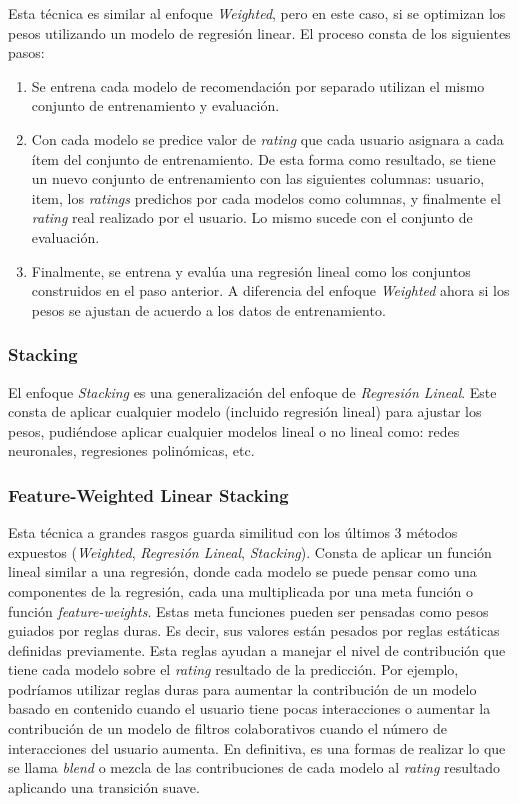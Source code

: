 \documentclass[11pt,a4paper,twoside]{thesis}
\begin{document}
Esta técnica es similar al enfoque \textit{Weighted}, pero en este caso, si se
optimizan los pesos utilizando un modelo de regresión linear. El proceso consta
de los siguientes pasos:

\begin{enumerate}
	\item Se entrena cada modelo de recomendación por separado utilizan el mismo conjunto
	      de entrenamiento y evaluación.
	\item Con cada modelo se predice valor de \textit{rating} que cada usuario asignara a
	      cada ítem del conjunto de entrenamiento. De esta forma como resultado, se tiene
	      un nuevo conjunto de entrenamiento con las siguientes columnas: usuario, item,
	      los \textit{ratings} predichos por cada modelos como columnas, y finalmente el
	      \textit{rating} real realizado por el usuario. Lo mismo sucede con el conjunto
	      de evaluación.
	\item Finalmente, se entrena y evalúa una regresión lineal como los conjuntos
	      construidos en el paso anterior. A diferencia del enfoque \textit{Weighted}
	      ahora si los pesos se ajustan de acuerdo a los datos de entrenamiento.
\end{enumerate}

\subsubsection{Stacking}

El enfoque \textit{Stacking} es una generalización del enfoque de
\textit{Regresión Lineal}. Este consta de aplicar cualquier modelo (incluido
regresión lineal) para ajustar los pesos, pudiéndose aplicar cualquier modelos
lineal o no lineal como: redes neuronales, regresiones polinómicas, etc.

\subsubsection{Feature-Weighted Linear Stacking}

Esta técnica a grandes rasgos guarda similitud con los últimos 3 métodos
expuestos (\textit{Weighted}, \textit{Regresión Lineal}, \textit{Stacking}).
Consta de aplicar un función lineal similar a una regresión, donde cada modelo
se puede pensar como una componentes de la regresión, cada una multiplicada por
una meta función o función \textit{feature-weights}. Estas meta funciones
pueden ser pensadas como pesos guiados por reglas duras. Es decir, sus valores
están pesados por reglas estáticas definidas previamente. Esta reglas ayudan a
manejar el nivel de contribución que tiene cada modelo sobre el \textit{rating}
resultado de la predicción. Por ejemplo, podríamos utilizar reglas duras para
aumentar la contribución de un modelo basado en contenido cuando el usuario
tiene pocas interacciones o aumentar la contribución de un modelo de filtros
colaborativos cuando el número de interacciones del usuario aumenta. En
definitiva, es una formas de realizar lo que se llama \textit{blend} o mezcla
de las contribuciones de cada modelo al \textit{rating} resultado aplicando una
transición suave.
\end{document}
